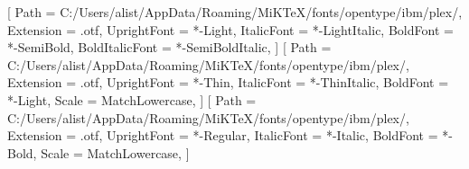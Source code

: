 
\usepackage{microtype}
\usepackage{graphicx}
\usepackage{fontspec}
\usepackage{unicode-math}
\usepackage[dvipsnames]{xcolor}
\usepackage{titlesec}
\usepackage{fancyhdr}
\usepackage{tikz}
\usepackage{lettrine}
\usepackage{titletoc}


\setmainfont{IBMPlexSerif}[
  Path           = C:/Users/alist/AppData/Roaming/MiKTeX/fonts/opentype/ibm/plex/,
  Extension      = .otf,
  UprightFont    = *-Light,
  ItalicFont     = *-LightItalic,
  BoldFont       = *-SemiBold,
  BoldItalicFont = *-SemiBoldItalic,
]
\setsansfont{IBMPlexSans}[
  Path           = C:/Users/alist/AppData/Roaming/MiKTeX/fonts/opentype/ibm/plex/,
  Extension      = .otf,
  UprightFont    = *-Thin,
  ItalicFont     = *-ThinItalic,
  BoldFont       = *-Light,
  Scale          = MatchLowercase,
]
\setmonofont{IBMPlexMono}[
  Path           = C:/Users/alist/AppData/Roaming/MiKTeX/fonts/opentype/ibm/plex/,
  Extension      = .otf,
  UprightFont    = *-Regular,
  ItalicFont     = *-Italic,
  BoldFont       = *-Bold,
  Scale          = MatchLowercase,
]

\makeatletter
\renewcommand{\@makechapterhead}[1]{%
  \thispagestyle{empty}%
  \begin{tikzpicture}[remember picture, overlay]
    \node[anchor=north east, inner sep=0pt]
      at ([xshift=-22mm, yshift=-22mm]current page.north east)
      {\fontsize{260}{260}\selectfont\color{atlassoft!30}\thechapter};
  \end{tikzpicture}%
  \tsticker%
  \vspace*{95mm}%
  {\noindent\sffamily\fontsize{8.5}{10}\selectfont\color{atlas}\MakeUppercase{Chapter \thechapter}\par}
  \vspace{3mm}%
  {\noindent\color{atlas}\rule{45mm}{0.6pt}\par}
  \vspace{8mm}%
  {\noindent\bfseries\color{atlasdeep}\fontsize{48}{54}\selectfont\raggedright #1\par}
  \vspace{18mm}%
}
\renewcommand{\@makeschapterhead}[1]{%
  \thispagestyle{empty}%
  \tsticker%
  \vspace*{95mm}%
  {\noindent\bfseries\color{atlasdeep}\fontsize{42}{48}\selectfont\raggedright #1\par}
  \vspace{18mm}%
}
\makeatother


